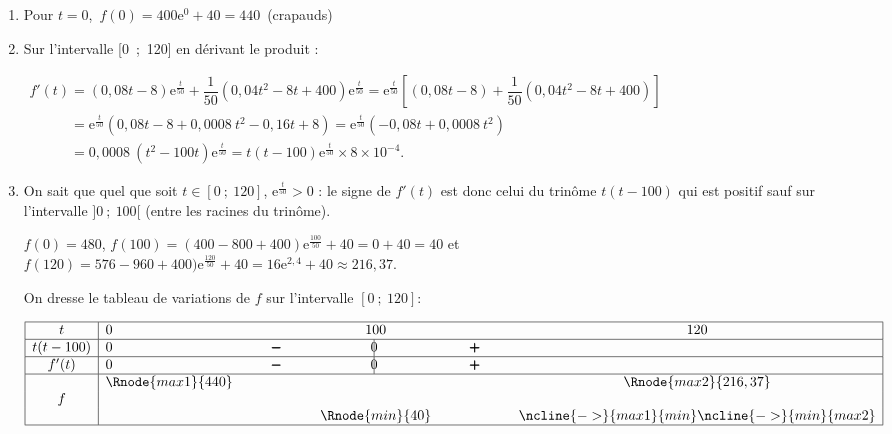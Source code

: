 \documentclass[10pt]{article}
\providecommand{\e}{{\mathrm{e}}}
\providecommand{\np}[2][]{{#2~#1}}
\begin{document}
\begin{enumerate}
\item 
Pour $t = 0$,\, $f(0) = 400 \e^{0} + 40 = 440$~(crapauds)
\item 



Sur l'intervalle [0~;~120] en dérivant le produit :

$\begin{gathered}f'(t) = (0,08t - 8)\text{e}^{\frac{t}{50}} + \dfrac{1}{50}\left(0,04t^2 - 8t + 400\right)\text{e}^{\frac{t}{50}} = \text{e}^{\frac{t}{50}}\left[(0,08t - 8) + \dfrac{1}{50}\left(0,04t^2 - 8t + 400\right)\right]\\
\phantom{f'(t)} 
= \text{e}^{\frac{t}{50}}\left(0,08t - 8 + \np{0,0008}t^2 - 0,16 t + 8 \right)
= \text{e}^{\frac{t}{50}}\left(-0,08t + \np{0,0008}t^2\right) \\
\phantom{f'(t)} 
= \np{0,0008}\left(t^2 - 100t\right)\text{e}^{\frac{t}{50}} 
= t(t - 100)\text{e}^{\frac{t}{50}} \times 8 \times 10^{-4}.\end{gathered}$



\item 
On sait que quel que soit $t \in [0~;~120]$, $\text{e}^{\frac{t}{50}} > 0$ : le signe de $f'(t)$ est donc celui du trinôme $t(t - 100)$ qui est positif sauf sur l'intervalle $]0~;~100[$ (entre les racines du trinôme). 

$f(0) = 480$, $f(100) = (400 - 800 + 400)\text{e}^{\frac{100}{50}}  + 40 = 0 + 40 = 40$ et \\
$f(120) = 576  - 960 + 400)\text{e}^{\frac{120}{50}} + 40 = 16 \text{e}^{2,4} + 40 \approx 216,37$.

On dresse le tableau de variations de $f$ sur l'intervalle $[0~;~120]$:

\begin{center}
{\renewcommand{\arraystretch}{1.3}
\def\esp{\hspace*{1.5cm}}
\def\hauteur{0pt}
$\begin{array}{|c|l *3{c} c|}
\hline
 t & 0 & \esp & 100 & \esp & 120 \\
 \hline
t(t-100) & 0 &  \pmb{-} & \vline\hspace{-2.7pt}0 & \pmb{+} & \\  
 \hline
f'(t) &  0 &  \pmb{-} & \vline\hspace{-2.7pt}0 & \pmb{+} & \\  
\hline
  & \Rnode{max1}{440}  &  &  &  & \Rnode{max2}{216,37}   \\
f & &  & & &  \rule{0pt}{\hauteur} \\
 &  & &   \Rnode{min}{40} & & \rule{0pt}{\hauteur}
\ncline{->}{max1}{min} \ncline{->}{min}{max2}\\
\hline
\end{array}$
}
\end{center}



\end{enumerate}
\end{document}
